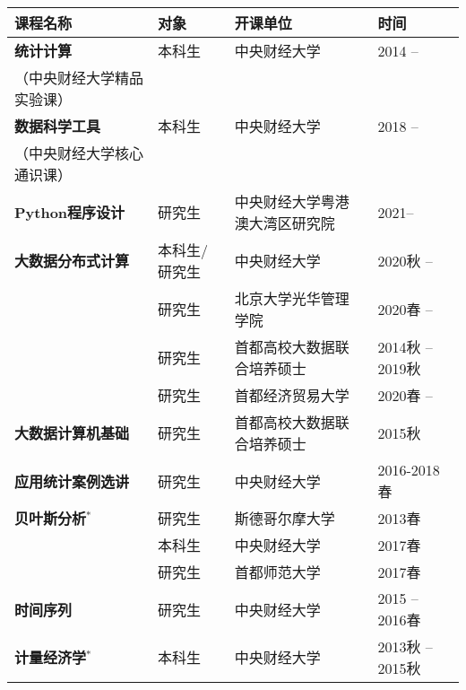 \documentclass[twoside,a4paper,10.5pt]{article}
\begin{document}
\begin{tabular}{l l ll}
  \toprule
  课程名称                                  & 对象          & 开课单位                       & 时间             \\
  \midrule
  \textbf{统计计算}                         & 本科生        & 中央财经大学                   & 2014 --          \\
  \footnotesize{（中央财经大学精品实验课）} &               &                                &                  \\
  \textbf{数据科学工具}                     & 本科生        & 中央财经大学                   & 2018 --          \\
  \footnotesize{（中央财经大学核心通识课）} &               &                                &                  \\
  \textbf{Python程序设计}                   & 研究生        & 中央财经大学粤港澳大湾区研究院 & 2021--           \\
  \textbf{大数据分布式计算}                 & 本科生/研究生 & 中央财经大学                   & 2020秋 --        \\
                                            & 研究生        & 北京大学光华管理学院           & 2020春 --        \\
                                            & 研究生        & 首都高校大数据联合培养硕士     & 2014秋 -- 2019秋 \\
                                            & 研究生        & 首都经济贸易大学               & 2020春 --        \\
  \textbf{大数据计算机基础}                 & 研究生        & 首都高校大数据联合培养硕士     & 2015秋           \\
  \textbf{应用统计案例选讲}                 & 研究生        & 中央财经大学                   & 2016-2018春      \\
  \textbf{贝叶斯分析}$^*$                   & 研究生        & 斯德哥尔摩大学                 & 2013春           \\
                                            & 本科生        & 中央财经大学                   & 2017春           \\
                                            & 研究生        & 首都师范大学                   & 2017春           \\
  \textbf{时间序列}                         & 研究生        & 中央财经大学                   & 2015 -- 2016春   \\
  \textbf{计量经济学}$^*$                   & 本科生        & 中央财经大学                   & 2013秋 -- 2015秋 \\

\end{tabular}
\end{document}
